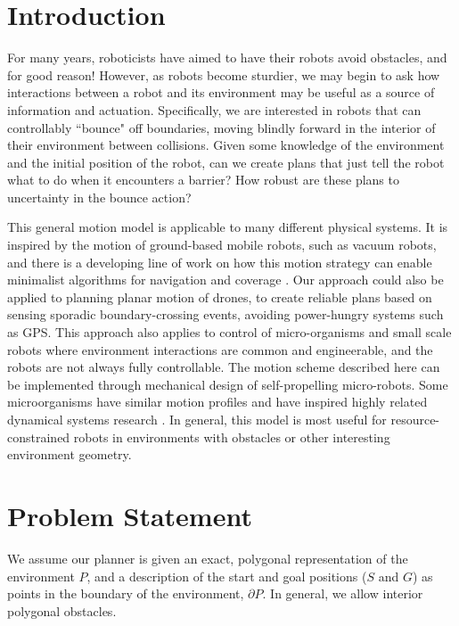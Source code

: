 \documentclass[conference]{IEEEtran}
\begin{document}
\IEEEpeerreviewmaketitle

\section{Introduction}

For many years, roboticists have aimed to have their robots
avoid obstacles, and for good
reason! However, as robots become sturdier, we may begin to ask how interactions between a robot
and its environment may be useful as a source of information and
actuation. Specifically, we are interested in robots that can controllably 
``bounce" off boundaries, moving blindly forward in the interior of their
environment between collisions. Given some knowledge of the environment and
the initial position of the robot, can we create plans that just tell
the robot what to do when it encounters a barrier? How robust are these plans to
uncertainty in the bounce action?

This general motion model is applicable to many different
physical systems. It is inspired by the motion of ground-based mobile robots,
such as vacuum robots, and there is a developing line of work on how this
motion strategy can enable minimalist algorithms for navigation and coverage \cite{LewOKa13} \cite{alam2017minimalist} \cite{alam2018space}.
Our approach could also be applied to planning planar
motion of drones, to create reliable plans based on sensing sporadic 
boundary-crossing events, avoiding power-hungry systems such as GPS.
This approach also applies to
control of micro-organisms and small scale robots where environment
interactions are common and engineerable, and the robots are not always fully
controllable. The motion scheme described here can be implemented through
mechanical design of self-propelling micro-robots. Some microorganisms have
similar motion profiles and have inspired highly related dynamical systems research \cite{microorganism2017}.
In general, this model is most useful for resource-constrained robots in
environments with obstacles or other interesting environment geometry.

\section{Problem Statement}

We assume our planner is given an exact, polygonal representation of the
environment $P$, and a description of the start and goal positions ($S$ and $G$) as 
points in the boundary of the environment, $\partial P$. In general, we allow
interior polygonal obstacles.
\end{document}
